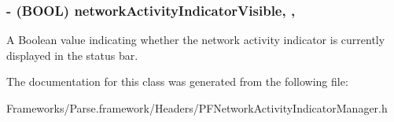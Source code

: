 \subsubsection[{network\+Activity\+Indicator\+Visible}]{\setlength{\rightskip}{0pt plus 5cm}-\/ (B\+O\+O\+L) network\+Activity\+Indicator\+Visible\hspace{0.3cm}{\ttfamily [read]}, {\ttfamily [nonatomic]}, {\ttfamily [assign]}}\label{interface_p_f_network_activity_indicator_manager_a1e3d2adc9c714d59c15b63df0f9e8c9a}
A Boolean value indicating whether the network activity indicator is currently displayed in the status bar. 

The documentation for this class was generated from the following file\+:\begin{DoxyCompactItemize}
\item 
Frameworks/\+Parse.\+framework/\+Headers/P\+F\+Network\+Activity\+Indicator\+Manager.\+h\end{DoxyCompactItemize}
